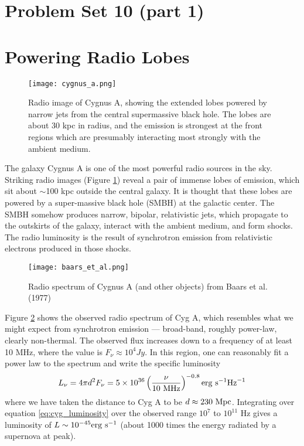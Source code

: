 \documentclass[11pt]{article}
\begin{document}
\pagestyle{empty}

\section*{\centering Problem Set 10 (part 1)}

\section{Powering Radio Lobes}

\begin{figure}[!ht]\centering
\texttt{[image: cygnus\_a.png]}
\caption{
Radio image of Cygnus A, showing the extended lobes powered by narrow jets from
the central supermassive black hole. The lobes are about 30 kpc in radius,
and the emission is strongest at the front regions which are presumably
interacting most strongly with the ambient medium.
}\label{fig:cygnus_a}
\end{figure}

The galaxy Cygnus A is one of the most powerful radio sources in the sky.
Striking radio images (Figure \ref{fig:cygnus_a}) reveal a pair of immense lobes of emission,
which sit about $\sim$100 kpc outside the central galaxy. It is thought that these
lobes are powered by a super-massive black hole (SMBH) at the galactic center.
The SMBH somehow produces narrow, bipolar, relativistic jets, which propagate
to the outskirts of the galaxy, interact with the ambient medium, and form
shocks. The radio luminosity is the result of synchrotron emission from
relativistic electrons produced in those shocks.

\begin{figure}[!ht]\centering
\texttt{[image: baars\_et\_al.png]}
\caption{
Radio spectrum of Cygnus A (and other objects) from Baars et al. (1977)
}\label{fig:baars_et_al}
\end{figure}

Figure \ref{fig:baars_et_al} shows the observed radio spectrum of Cyg A, which
resembles what we might expect from synchrotron emission --- broad-band, roughly
power-law, clearly non-thermal. The observed flux increases down to a frequency
of at least 10 MHz, where the value is
$F_\nu\approx10^4 Jy$.  In this region, one can reasonably fit a power law to
the spectrum and write the specific luminosity
\begin{equation}
L_\nu=4\pi d^2F_\nu=5\times 10^{36}\left(\frac{\nu}{10~{\rm MHz}}\right)^{-0.8} {\rm erg~s}^{-1}{\rm Hz}^{-1}
\label{eq:cyg_luminosity}
\end{equation}
where we have taken the distance to Cyg A to be $d\approx230~{\rm Mpc}$.  Integrating over
equation \ref{eq:cyg_luminosity} over the observed range $10^7$ to $10^{11}$ Hz gives a luminosity
of $L\sim10^{-45}{\rm erg~s}^{-1}$ (about 1000 times the energy radiated by a supernova at peak).
\end{document}
